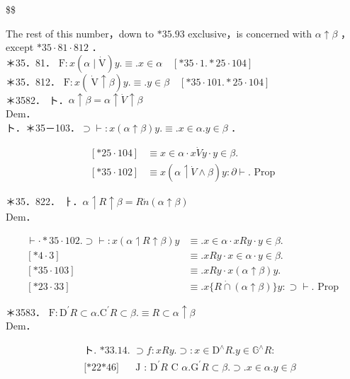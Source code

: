 \documentclass[10pt]{article}
\begin{document}
\$\$

The rest of this number，down to $* 35.93$ exclusive，is concerned with $\alpha \uparrow \beta$ ， except $* 35 \cdot 81 \cdot 812$ ．\\
＊35．81． $\mathrm{F}: x(\alpha \mid \dot{\mathrm{V}}) y . \equiv . x \in \alpha \quad[* 35 \cdot 1 . * 25 \cdot 104]$\\
＊35．812． $\mathrm{F}: x(\dot{\mathrm{~V}} \uparrow \beta) y . \equiv . y \in \beta \quad[* 35 \cdot 101 . * 25 \cdot 104]$\\
＊3582． ト．$\alpha \uparrow \beta=\alpha \uparrow \dot{V} \uparrow \beta$\\
Dem．\\
ト．＊35－103．$\supset \vdash: x(\alpha \uparrow \beta) y . \equiv . x \in \alpha . y \in \beta$ ．

$$
\begin{array}{ll}
{[* 25 \cdot 104]} & \equiv x \in \alpha \cdot x \dot{V} y \cdot y \in \beta . \\
{[* 35 \cdot 102]} & \equiv x(\alpha \upharpoonleft \dot{V} \wedge \beta) y: \partial \vdash . \text { Prop }
\end{array}
$$

＊35．822． ㅏ．$\alpha \upharpoonleft R \uparrow \beta=R \dot{n}(\alpha \uparrow \beta)$\\
Dem．

$$
\begin{array}{ll}
\vdash \cdot * 35 \cdot 102 . \supset \vdash: x(\alpha \upharpoonleft R \uparrow \beta) y & \equiv . x \in \alpha \cdot x R y \cdot y \in \beta . \\
{[* 4 \cdot 3]} & \equiv . x R y \cdot x \in \alpha \cdot y \in \beta . \\
{[* 35 \cdot 103]} & \equiv . x R y \cdot x(\alpha \uparrow \beta) y . \\
{[* 23 \cdot 33]} & \equiv . x\{R \dot{\cap}(\alpha \uparrow \beta)\} y: \supset \vdash . \text { Prop }
\end{array}
$$

＊3583． $\mathrm{F}: \mathrm{D}^{\prime} R \subset \alpha . \mathrm{C}^{\prime} R \subset \beta . \equiv R \subset \alpha \uparrow \beta$\\
Dem．


\begin{align*}
& \text { ト. *33.14. } \supset f: x R y . \supset: x \in \mathrm{D}^{\wedge} R . y \in \mathbb{G}^{\wedge} R: \\
& \text { [*22*46] } \quad \text { J : } \mathrm{D}^{\prime} R \text { C } \alpha . \mathrm{G}^{\prime} R \subset \beta . \supset . x \in \alpha . y \in \beta \tag{1}
\end{align*}
\end{document}
